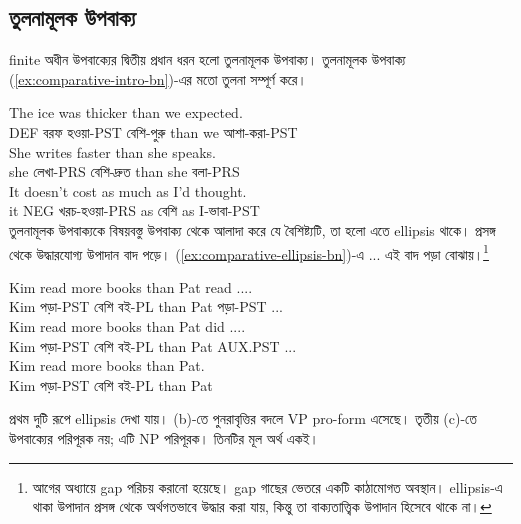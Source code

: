 \subsection{তুলনামূলক উপবাক্য}

finite অধীন উপবাক্যের দ্বিতীয় প্রধান ধরন হলো তুলনামূলক উপবাক্য। তুলনামূলক উপবাক্য (\ref{ex:comparative-intro-bn})-এর মতো তুলনা সম্পূর্ণ করে।

\ea \label{ex:comparative-intro-bn}
    \ea \gll The ice was thicker than {\ob}we expected{\cb}.\\
        DEF বরফ হওয়া-PST বেশি-পুরু than we আশা-করা-PST\\
    \glt {}
    \ex \gll She writes faster than {\ob}she speaks{\cb}.\\
        she লেখা-PRS বেশি-দ্রুত than she বলা-PRS\\
    \glt {}
    \ex \gll It doesn't cost as much as {\ob}I'd thought{\cb}.\\
        it NEG খরচ-হওয়া-PRS as বেশি as I-ভাবা-PST\\
    \glt {}
    \z
\z
তুলনামূলক উপবাক্যকে বিষয়বস্তু উপবাক্য থেকে আলাদা করে যে বৈশিষ্ট্যটি, তা হলো এতে ellipsis থাকে। প্রসঙ্গ থেকে উদ্ধারযোগ্য উপাদান বাদ পড়ে। (\ref{ex:comparative-ellipsis-bn})-এ ... এই বাদ পড়া বোঝায়।\footnote{আগের অধ্যায়ে gap পরিচয় করানো হয়েছে। gap গাছের ভেতরে একটি কাঠামোগত অবস্থান। ellipsis-এ থাকা উপাদান প্রসঙ্গ থেকে অর্থগতভাবে উদ্ধার করা যায়, কিন্তু তা বাক্যতাত্ত্বিক উপাদান হিসেবে থাকে না।}

\ea \label{ex:comparative-ellipsis-bn}
    \ea \gll Kim read more books than {\ob}Pat read ...{\cb}.\\
        Kim পড়া-PST বেশি বই-PL than Pat পড়া-PST ...\\
    \glt {}
    \ex \gll Kim read more books than {\ob}Pat did ...{\cb}.\\
        Kim পড়া-PST বেশি বই-PL than Pat AUX.PST ...\\
    \glt {}
    \ex \gll Kim read more books than {\ob}Pat{\cb}.\\
        Kim পড়া-PST বেশি বই-PL than Pat\\
    \glt {}
    \z
\z

প্রথম দুটি রূপে ellipsis দেখা যায়। (b)-তে  পুনরাবৃত্তির বদলে VP pro-form  এসেছে। তৃতীয় (c)-তে  উপবাক্যের পরিপূরক নয়; এটি NP পরিপূরক। তিনটির মূল অর্থ একই।

